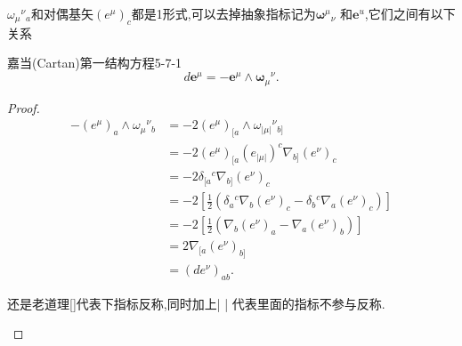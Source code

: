 \documentclass[../main.tex]{subfiles}
\begin{document}
$\omega_\mu{}^{\nu}{}_{a}$和对偶基矢$(e^\mu)_c$都是1形式,可以去掉抽象指标记为$\bm{\omega}^{\mu}{}_{\nu} $ 和$\bm{e}^{u} $,它们之间有以下关系
\begin{theorem}
  {嘉当(Cartan)第一结构方程}{5-7-1} \[
 d\bm{e}^\mu = -\bm{e}^\mu \wedge \bm{\omega}_{\mu}{}^{\nu}    
  .\] 
\end{theorem}
\begin{proof}
  \begin{align*}
    -(e^\mu)_a \wedge \omega_\mu{}^{\nu}{}_{b} &=  -2 (e^\mu)_{[a} \wedge \omega_{|\mu|}{}^{\nu}{}_{b]}\\
                                               & = -2 (e^\mu)_{[a}(e_{|\mu|})^c \nabla _{b]}(e^\nu)_c\\
                                               &= -2 \delta_{[a}{}^{c}\nabla_{b]}(e^\nu)_c\\
                                               & = -2 [\frac{1}{2}(\delta_{a}{}^{c}\nabla_b(e^\nu)_c - \delta_{b}{}^{c}\nabla _a(e^\nu)_c)]\\
                                               & = -2 [\frac{1}{2}(\nabla_b(e^\nu)_a - \nabla _a(e^\nu)_b)]\\
                                               & = 2 \nabla_{[a}(e^\nu)_{b]} \\
                                               & = (de^\nu)_{ab}
  .\end{align*}
  \begin{note}
    还是老道理[]代表下指标反称,同时加上| | 代表里面的指标不参与反称. 
  \end{note}
\end{proof}
\end{document}
